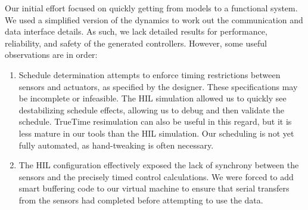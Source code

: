 Our initial effort focused on quickly getting from models to a functional system. We used a simplified version of the dynamics to work out the communication and data interface details.  As such, we lack detailed results for performance, reliability, and safety of the generated controllers. However, some useful observations are in order:

\begin{enumerate}
\item Schedule determination attempts to enforce timing restrictions between sensors and actuators, as specified by the designer.  These specifications may be incomplete or infeasible.  The HIL simulation allowed us to quickly see destabilizing schedule effects, allowing us to debug and then validate the schedule.  TrueTime resimulation can also be useful in this regard, but it is less mature in our tools than the HIL simulation.  Our scheduling is not yet fully automated, as hand-tweaking is often necessary.
\item The HIL configuration effectively exposed the lack of synchrony between the sensors and the precisely timed control calculations.  We were forced to add smart buffering code to our virtual machine to ensure that serial transfers from the sensors had completed before attempting to use the data.
\end{enumerate}
